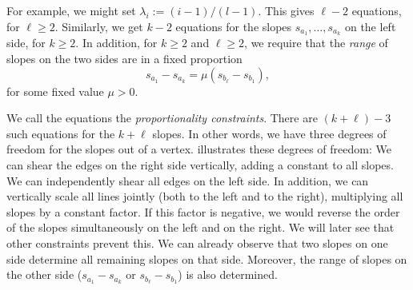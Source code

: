 \documentclass{patmorin}
\begin{document}
For example, we might set $\lambda_i := (i-1)/(l-1)$.
This gives $\ell-2$ equations, for $\ell\ge 2$. Similarly, we get
$k-2$ equations for the slopes
$s_{a_1}, \dots, s_{a_{k}}$ on the left side, for $k\ge 2$.
In addition, for $k\ge 2$ and $\ell\ge 2$, we require that the \emph{range} of
slopes
on the two sides are in a fixed proportion
\begin{equation}
  \label{eq:proportion2}
s_{a_1}-s_{a_{k}} = \mu (s_{b_{\ell}}-s_{b_1}),
\end{equation}
for some fixed value $\mu>0$.

We call the equations
\thetag{\ref{eq:proportion}--\ref{eq:proportion2}} the
\emph{proportionality constraints}.
There are $(k+\ell)-3$ such equations for the $k+\ell$ slopes. In
other words, we have three degrees of freedom for the slopes out of a vertex.
 illustrates these  degrees of freedom:
We can shear the edges on the right side vertically, adding a constant to all
slopes.
 We can independently shear all edges on the left side.
In addition, we can vertically scale {all} lines jointly (both to
the left and to the right), multiplying all slopes by a constant factor.
If this factor is negative, we would reverse the order of the
slopes simultaneously on the left and on the right. 
We will later see that other constraints prevent this.
We can already observe that two slopes on one side determine all
remaining slopes on that side. Moreover, the range of slopes
on the other side
($s_{a_1}-s_{a_{k}}$ or $s_{b_{\ell}}-s_{b_1}$) is also determined.
\end{document}
